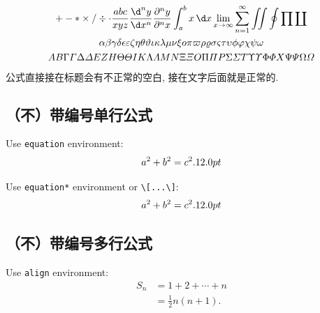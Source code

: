 \begin{gather*}
    +-*\times/ \div  \cdot\frac{abc}{xyz} \frac{\d^n y}{\d x^n} \frac{\partial^n y}{\partial^n x} \int_{a}^{b} x \,\d x  \lim_{x \to \infty}  \sum_{n = 1}^{\infty}  \iint \oint \prod \coprod  \\
    \alpha\beta\gamma\delta \epsilon \varepsilon \zeta \eta \theta \vartheta \iota \kappa \lambda \mu \nu \xi o \pi \varpi \rho \varrho \sigma \varsigma \tau \upsilon \phi \varphi \chi \psi \omega\\
    A B \Gamma \varGamma \Delta \varDelta E Z H \Theta \varTheta I K \Lambda \varLambda M N \Xi \varXi O \Pi \varPi P \Sigma \varSigma T \Upsilon \varUpsilon \Phi \varPhi X \Psi \varPsi \Omega \varOmega
\end{gather*}
公式直接接在标题会有不正常的空白, 接在文字后面就是正常的.

\subsection{（不）带编号单行公式\the\baselineskip}

Use \texttt{equation} environment: \the\baselineskip
\begin{equation}
    a^2 + b^2 = c^2. \the\baselineskip
\end{equation}
\the\baselineskip

Use \texttt{equation*} environment or \texttt{\textbackslash[...\textbackslash]}: \the\baselineskip
\[ a^2 + b^2 = c^2. \the\baselineskip\]
\the\baselineskip
\subsection{（不）带编号多行公式}

Use \texttt{align} environment:
\begin{align}
    S_n & = 1 + 2 + \cdots + n \\
        & = \frac12 n(n+1).
\end{align}

